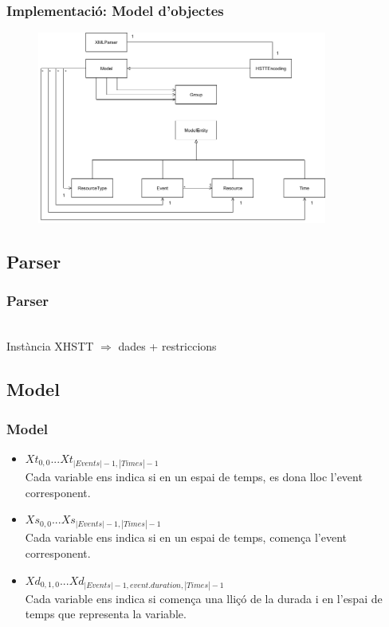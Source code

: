 \documentclass[13pt]{beamer}
\begin{document}
  \begin{frame}
    \frametitle{Implementació: Model d'objectes}
    \begin{figure}[p]
      \includegraphics[width=0.85\textwidth]{Diagrames/UMLKai.png}
      \label{fig:procs}
    \end{figure}
  \end{frame}


  
  \subsection{Parser}
  
  \begin{frame}[fragile]
    \frametitle{Parser}
    \begin{minipage}{.5\textwidth}
            
    \end{minipage}
    \begin{minipage}{.4\textwidth}
            
    \end{minipage}
    ~\\
    Instància XHSTT $\Rightarrow$ dades + restriccions
  \end{frame}

  \subsection{Model}
   
  \begin{frame}
    \frametitle{Model}

    \begin{itemize}
      \item $Xt_{0,0} . . . Xt_{|Events|-1,|Times|-1}$\\Cada variable ens indica si en un espai de temps, es dona lloc l'event corresponent.
      \item $Xs_{0,0} . . . Xs_{|Events|-1,|Times|-1}$\\Cada variable ens indica si en un espai de temps, comença l'event corresponent.
      \item $Xd_{0,1,0} . . . Xd_{|Events|-1, event.duration, |Times|-1}$\\ 
      Cada variable ens indica si comença una lliçó de la durada i en l'espai de temps que representa la variable. 
    \end{itemize}
  \end{frame}
\end{document}
